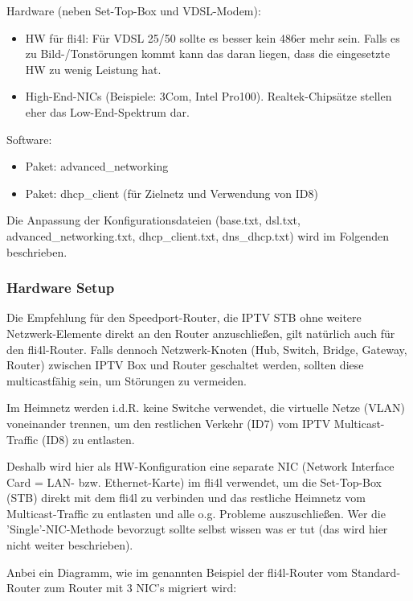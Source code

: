 Hardware (neben Set-Top-Box und VDSL-Modem):
\begin{itemize}
   \item{HW für fli4l: Für VDSL 25/50 sollte es besser kein 486er mehr sein.
Falls es zu Bild-/Tonstörungen kommt kann das daran liegen, dass die eingesetzte
HW zu wenig Leistung hat.}
   \item{High-End-NICs (Beispiele: 3Com, Intel Pro100). Realtek-Chipsätze
stellen    eher das Low-End-Spektrum dar.}
\end{itemize}

Software:
\begin{itemize}
   \item{Paket: advanced\_networking}
   \item{Paket: dhcp\_client (für Zielnetz und Verwendung von ID8)}
\end{itemize}

Die Anpassung der Konfigurationsdateien (base.txt, dsl.txt,
advanced\_networking.txt, dhcp\_client.txt, dns\_dhcp.txt) wird im Folgenden
beschrieben.

\subsubsection{Hardware Setup}

Die Empfehlung für den Speedport-Router, die IPTV STB ohne weitere
Netzwerk-Elemente direkt an den Router anzuschließen, gilt natürlich auch für
den fli4l-Router. Falls dennoch Netzwerk-Knoten (Hub, Switch, Bridge, Gateway,
Router) zwischen IPTV Box und Router geschaltet werden, sollten diese
multicastfähig sein, um Störungen zu vermeiden.

Im Heimnetz werden i.d.R. keine Switche verwendet, die virtuelle Netze (VLAN)
voneinander trennen, um den restlichen Verkehr (ID7) vom IPTV Multicast-Traffic
(ID8) zu entlasten.

Deshalb wird hier als HW-Konfiguration eine separate NIC (Network Interface Card
= LAN- bzw. Ethernet-Karte) im fli4l verwendet, um die Set-Top-Box (STB) direkt
mit dem fli4l zu verbinden und das restliche Heimnetz vom Multicast-Traffic zu
entlasten und alle o.g. Probleme auszuschließen. Wer die 'Single'-NIC-Methode
bevorzugt sollte selbst wissen was er tut (das wird hier nicht weiter
beschrieben).

Anbei ein Diagramm, wie im genannten Beispiel der fli4l-Router
vom Standard-Router zum Router mit 3 NIC’s migriert wird:

